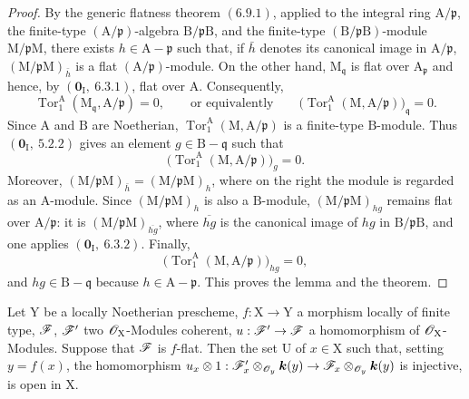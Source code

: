\begin{proof}

By the generic flatness theorem $(6.9.1)$, applied to the integral ring
$\mathrm{A}/\mathfrak{p}$, the finite-type
$(\mathrm{A}/\mathfrak{p})$-algebra
$\mathrm{B}/\mathfrak{p}\mathrm{B}$, and the finite-type
$(\mathrm{B}/\mathfrak{p}\mathrm{B})$-module
$\mathrm{M}/\mathfrak{p}\mathrm{M}$, there exists
$h\in\mathrm{A}-\mathfrak{p}$ such that, if $\bar h$ denotes its canonical
image in $\mathrm{A}/\mathfrak{p}$,
$(\mathrm{M}/\mathfrak{p}\mathrm{M})_{\bar h}$ is a flat
$(\mathrm{A}/\mathfrak{p})$-module. On the other hand,
$\mathrm{M}_{\mathfrak q}$ is flat over $\mathrm{A}_{\mathfrak p}$ and
hence, by $(\mathbf{0}_\mathrm{I},~6.3.1)$, flat over $\mathrm{A}$.
Consequently,
\[
  \operatorname{Tor}_1^\mathrm{A}
  (\mathrm{M}_{\mathfrak q},\mathrm{A}/\mathfrak p)=0,
  \qquad\text{or equivalently}\qquad
  \bigl(\operatorname{Tor}_1^\mathrm{A}
  (\mathrm{M},\mathrm{A}/\mathfrak p)\bigr)_{\mathfrak q}=0.
\]
Since $\mathrm{A}$ and $\mathrm{B}$ are Noetherian,
$\operatorname{Tor}_1^\mathrm{A}
(\mathrm{M},\mathrm{A}/\mathfrak p)$ is a finite-type
$\mathrm{B}$-module. Thus $(\mathbf{0}_\mathrm{I},~5.2.2)$ gives an element
$g\in\mathrm{B}-\mathfrak q$ such that
\[
  \bigl(\operatorname{Tor}_1^\mathrm{A}
  (\mathrm{M},\mathrm{A}/\mathfrak p)\bigr)_g=0.
\]
Moreover,
$(\mathrm{M}/\mathfrak p\mathrm{M})_{\bar h}
=(\mathrm{M}/\mathfrak p\mathrm{M})_h$, where on the right the module is
regarded as an $\mathrm{A}$-module. Since
$(\mathrm{M}/\mathfrak p\mathrm{M})_h$ is also a $\mathrm{B}$-module,
$(\mathrm{M}/\mathfrak p\mathrm{M})_{hg}$ remains flat over
$\mathrm{A}/\mathfrak p$: it is
$(\mathrm{M}/\mathfrak p\mathrm{M})_{\overline{hg}}$, where
$\overline{hg}$ is the canonical image of $hg$ in
$\mathrm{B}/\mathfrak p\mathrm{B}$, and one applies
$(\mathbf{0}_\mathrm{I},~6.3.2)$. Finally,
\[
  \bigl(\operatorname{Tor}_1^\mathrm{A}
  (\mathrm{M},\mathrm{A}/\mathfrak p)\bigr)_{hg}=0,
\]
and $hg\in\mathrm{B}-\mathfrak q$ because
$h\in\mathrm{A}-\mathfrak p$. This proves the lemma and the theorem.
\end{proof}

\begin{corollary}[11.1.2]
\label{IV.11.1.2}
Let $\mathrm{Y}$ be a locally Noetherian prescheme, $f:\mathrm{X}\to\mathrm{Y}$ a morphism locally of finite type, $\mathscr{F}$, $\mathscr{F}'$ two $\mathscr{O}_\mathrm{X}$-Modules coherent, $u:\mathscr{F}'\to\mathscr{F}$ a homomorphism of $\mathscr{O}_\mathrm{X}$-Modules. Suppose that $\mathscr{F}$ is $f$-flat. Then the set $\mathrm{U}$ of $x\in\mathrm{X}$ such that, setting $y=f(x)$, the homomorphism $u_x\otimes 1:\mathscr{F}'_x\otimes_{\mathscr{O}_y}\boldsymbol{k}(y)\to\mathscr{F}_x\otimes_{\mathscr{O}_y}\boldsymbol{k}(y)$ is injective, is open in $\mathrm{X}$.
\end{corollary}

